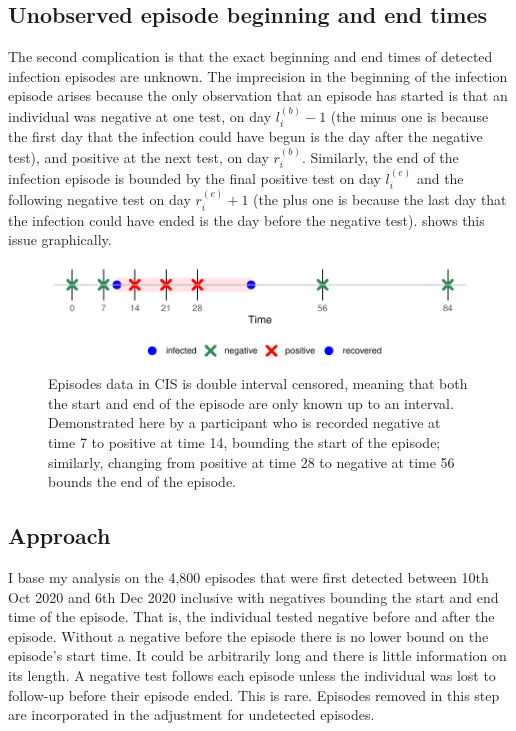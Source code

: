 \documentclass[thesis.tex]{subfiles}
\begin{document}
\subsection{Unobserved episode beginning and end times} \label{perf-test:sec:interval-censoring}

The second complication is that the exact beginning and end times of detected infection episodes are unknown.
The imprecision in the beginning of the infection episode arises because the only observation that an episode has started is that an individual was negative at one test, on day $l_i^{(b)}-1$ (the minus one is because the first day that the infection could have begun is the day after the negative test), and positive at the next test, on day $r_i^{(b)}$.
Similarly, the end of the infection episode is bounded by the final positive test on day $l_i^{(e)}$ and the following negative test on day $r_i^{(e)}+1$ (the plus one is because the last day that the infection could have ended is the day before the negative test).
 shows this issue graphically.
\begin{figure}
  \centering \includegraphics{cis-perfect-testing/double-interval-censor}
  \caption[Double-interval censoring in CIS data]{Episodes data in CIS is double interval censored, meaning that both the start and end of the episode are only known up to an interval. Demonstrated here by a participant who is recorded negative at time 7 to positive at time 14, bounding the start of the episode; similarly, changing from positive at time 28 to negative at time 56 bounds the end of the episode. \label{perf-test:fig:double-interval-censor}}
\end{figure}

\subsection{Approach} \label{perf-test:sec:approach}

I base my analysis on the 4,800 episodes that were first detected between 10th Oct 2020 and 6th Dec 2020 inclusive with negatives bounding the start and end time of the episode.
That is, the individual tested negative before and after the episode.
Without a negative before the episode there is no lower bound on the episode's start time.
It could be arbitrarily long and there is little information on its length.
A negative test follows each episode unless the individual was lost to follow-up before their episode ended.
This is rare.
Episodes removed in this step are incorporated in the adjustment for undetected episodes.
\end{document}
